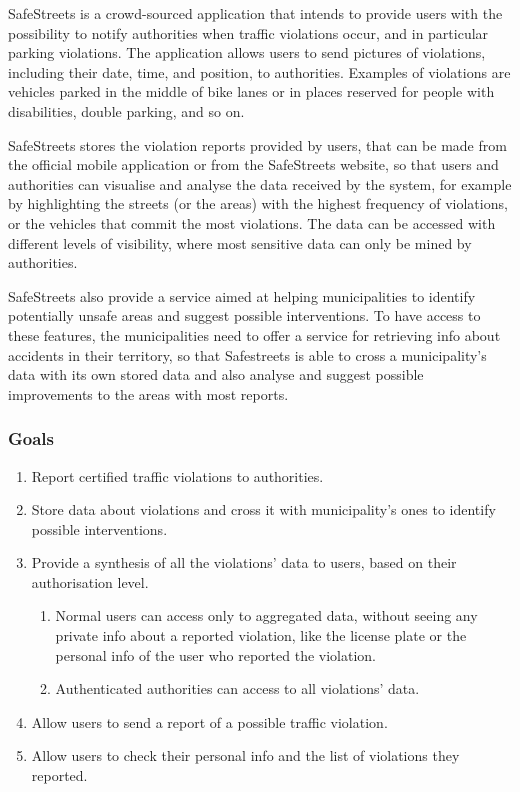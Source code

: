 SafeStreets is a crowd-sourced application that intends to provide users with the possibility to notify authorities when traffic violations occur, and in particular parking violations. The application allows users to send pictures of violations, including their date, time, and position, to authorities. Examples of violations are vehicles parked in the middle of bike lanes or in places reserved for people with disabilities, double parking, and so on.

SafeStreets stores the violation reports provided by users, that can be made from the official mobile application or from the SafeStreets website, so that users and authorities can visualise and analyse the data received by the system, for example by highlighting the streets (or the areas) with the highest frequency of violations, or the vehicles that commit the most violations. The data can be accessed with different levels of visibility, where most sensitive data can only be mined by authorities.

SafeStreets also provide a service aimed at helping municipalities to identify potentially unsafe areas and suggest possible interventions. To have access to these features, the municipalities need to offer a service for retrieving info about accidents in their territory, so that Safestreets is able to cross a municipality's data with its own stored data and also analyse and suggest possible improvements to the areas with most reports.
\subsubsection{Goals}
\begin{enumerate}[label={G\arabic*.}]
    \item Report certified traffic violations to authorities.
    \item Store data about violations and cross it with municipality's ones to identify possible interventions.
    \item Provide a synthesis of all the violations' data to users, based on their authorisation level.
    \begin{enumerate}[label={G\arabic{enumi}.\arabic*.}]
    	\item Normal users can access only to aggregated data, without seeing any private info about a reported violation, like the license plate or the personal info of the user who reported the violation.
    	\item Authenticated authorities can access to all violations' data.
    \end{enumerate}
	\item Allow users to send a report of a possible traffic violation.
	\item Allow users to check their personal info and the list of violations they reported.
\end{enumerate}
